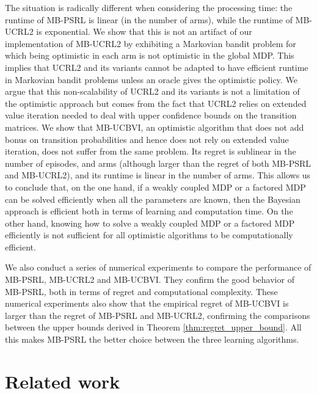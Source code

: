 The situation is radically different when considering the processing time: the runtime of MB-PSRL is linear (in the number of arms), while the runtime of MB-UCRL2 is exponential. We show that this is not an artifact of our implementation of MB-UCRL2 by exhibiting a Markovian bandit problem for which being optimistic in each arm is not optimistic in the global MDP. This implies that UCRL2 and its variants \cite{bourel2020tightening,fruit2018efficient,talebi2018variance,filippi2010optimism} cannot be adapted to have efficient runtime in Markovian bandit problems unless an oracle gives the optimistic policy. We argue that this non-scalability of UCRL2 and its variants is not a limitation  of the optimistic approach but comes from the fact that UCRL2 relies on  extended value iteration \cite{jaksch2010near} needed to deal with  upper confidence bounds on the transition matrices.  We show that MB-UCBVI, an optimistic algorithm that does not add bonus on transition probabilities and hence does not rely on extended value iteration,  does not suffer from the same problem. Its  regret is  sublinear in the number of episodes, and arms (although larger than the regret of both MB-PSRL and MB-UCRL2), and its  runtime is linear in the number of arms.
This allows us to conclude that, on the one hand, if a weakly coupled MDP or a factored MDP can be solved efficiently when all the parameters are known, then the Bayesian approach is efficient both in terms of learning and computation time. On the other hand, knowing how to solve a weakly coupled MDP or a factored MDP efficiently is not sufficient for all optimistic algorithms to be computationally efficient.

We also conduct a series of numerical experiments to compare the performance of MB-PSRL,  MB-UCRL2 and MB-UCBVI.  They confirm the good behavior of MB-PSRL, both in terms of regret and computational complexity. These numerical experiments also show that the empirical regret of MB-UCBVI is larger than the regret of MB-PSRL and MB-UCRL2, confirming the comparisons between the upper bounds derived in Theorem \ref{thm:regret_upper_bound}. All this  makes MB-PSRL the better choice between the three learning algorithms.

\section{Related work}
\label{ch:rested:related}

